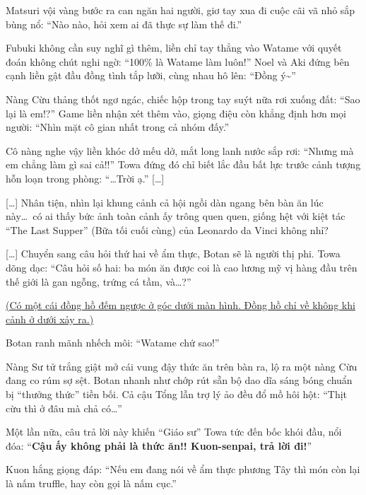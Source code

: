 \documentclass[../main.tex]{subfiles}
\begin{document}
Matsuri vội vàng bước ra can ngăn hai người, giơ tay xua đi cuộc cãi vã nhỏ sắp bùng nổ: ``Nào nào, hỏi xem ai đã thực sự làm thế đi.''

Fubuki không cần suy nghĩ gì thêm, liền chỉ tay thẳng vào Watame với quyết đoán không chút nghi ngờ: ``100\% là Watame làm luôn!'' Noel và Aki đứng bên cạnh liền gật đầu đồng tình tắp lưỡi, cùng nhau hô lên: ``Đồng ý\~{}''

Nàng Cừu thảng thốt ngơ ngác, chiếc hộp trong tay suýt nữa rơi xuống đất: ``Sao lại là em!?'' Game liền nhận xét thêm vào, giọng điệu còn khẳng định hơn mọi người: ``Nhìn mặt cô gian nhất trong cả nhóm đấy.''

Cô nàng nghe vậy liền khóc dở mếu dở, mắt long lanh nước sắp rơi: ``Nhưng mà em chẳng làm gì sai cả!!'' Towa đứng đó chỉ biết lắc đầu bất lực trước cảnh tượng hỗn loạn trong phòng: ``\dots Trời ạ.'' [\dots]

[\dots] Nhân tiện, nhìn lại khung cảnh cả hội ngồi dàn ngang bên bàn ăn lúc này\dots\ có ai thấy bức ảnh toàn cảnh ấy trông quen quen, giống hệt với kiệt tác ``The Last Supper'' (Bữa tối cuối cùng) của Leonardo da Vinci không nhỉ?



[\dots] Chuyển sang câu hỏi thứ hai về ẩm thực, Botan sẽ là người thị phi. Towa dõng dạc: ``Câu hỏi số hai: ba món ăn được coi là cao lương mỹ vị hàng đầu trên thế giới là gan ngỗng, trứng cá tầm, và\dots?''

\begin{center}
  \uline{(Có một cái đồng hồ đếm ngược ở góc dưới màn hình. Đồng hồ chỉ về không khi cảnh ở dưới xảy ra.)}
\end{center}

Botan ranh mãnh nhếch môi: ``Watame chứ sao!''


Nàng Sư tử trắng giật mở cái vung đậy thức ăn trên bàn ra, lộ ra một nàng Cừu đang co rúm sợ sệt. Botan nhanh như chớp rút sẵn bộ dao dĩa sáng bóng chuẩn bị ``thưởng thức'' tiền bối. Cả cậu Tổng lẫn trợ lý ảo đều đổ mồ hôi hột: ``Thịt cừu thì ở đâu mà chả có\dots''

Một lần nữa, câu trả lời này khiến ``Giáo sư'' Towa tức đến bốc khói đầu, nổi đóa: ``\textbf{Cậu ấy không phải là thức ăn!! Kuon-senpai, trả lời đi!}''

Kuon hắng giọng đáp: ``Nếu em đang nói về ẩm thực phương Tây thì món còn lại là nấm truffle, hay còn gọi là nấm cục.''
\end{document}
